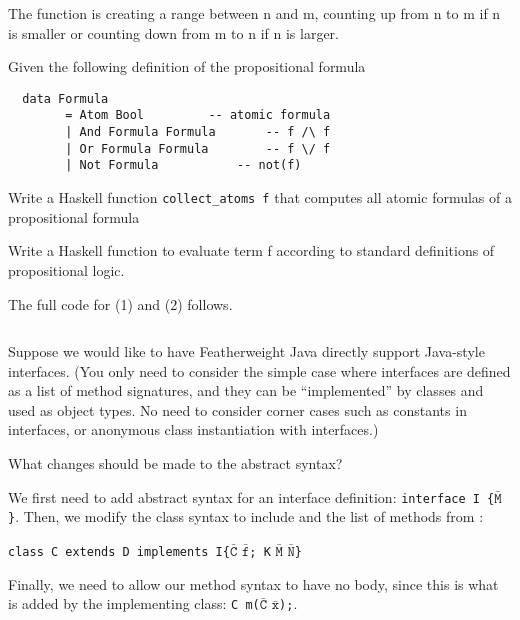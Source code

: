 \documentclass[12pt,letterpaper,twoside]{hmcpset}
\begin{document}
\begin{solution}
 The function is creating a range between n and m, counting up from n to m if n is smaller or counting down from m to n if n is larger.
\end{solution}

\begin{problem}[6]
 Given the following definition of the propositional formula
 \begin{verbatim}
  data Formula
        = Atom Bool			-- atomic formula
        | And Formula Formula		-- f /\ f
        | Or Formula Formula		-- f \/ f
        | Not Formula			-- not(f)
 \end{verbatim}
\end{problem}

\begin{problem}{6.1}
 Write a Haskell function \verb|collect_atoms f| that computes all atomic formulas of a propositional formula 
\end{problem}

\begin{problem}{6.2}
 Write a Haskell function  to evaluate term f according to standard definitions of propositional logic.
\end{problem}

\begin{solution}
 The full code for (1) and (2) follows.
 \inputminted{haskell}{code/formula.hs}
\end{solution}

\begin{problem}[7]
 Suppose we would like to have Featherweight Java directly support Java-style interfaces. (You only need to consider the simple case where interfaces are defined as a list of method signatures, and they can be ``implemented'' by classes and used as object types. No need to consider corner cases such as constants in interfaces, or anonymous class instantiation with interfaces.)
\end{problem}

\begin{problem}[7.1]
 What changes should be made to the abstract syntax?
\end{problem}

\begin{solution}
 We first need to add abstract syntax for an interface definition:
 \verb|interface I {|$\mathtt{\bar{M}}$\verb|}|.
 Then, we modify the class syntax to include  and the list of methods from :
 
 \verb|class C extends D implements I{|$\mathtt{\bar{C}}$ $\mathtt{\bar{f}}$\verb|; K| $\mathtt{\bar{M}}$ $\mathtt{\bar{N}}$\verb|}|
 
 Finally, we need to allow our method syntax to have no body, since this is what is added by the implementing class: \verb|C m(|$\mathtt{\bar{C}}$ $\mathtt{\bar{x}}$\verb|);|.
\end{solution}
\end{document}
